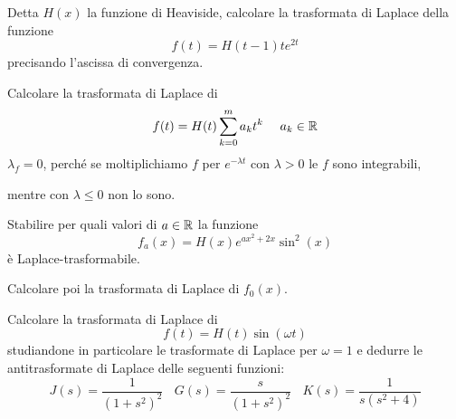 Detta $\displaystyle H( x)$ la funzione di Heaviside, calcolare la trasformata di Laplace della funzione
\begin{equation*}
f( t) =H( t-1) te^{2t}
\end{equation*}
precisando l'ascissa di convergenza.
\Esercizio{}

Calcolare la trasformata di Laplace di
\begin{equation*}
f( t) =H( t)\sum ^{m}_{k=0} a_{k} t^{k} \ \ \ \ a_{k} \in \RR 
\end{equation*}
$\displaystyle \lambda _{f} =0$, perché se moltiplichiamo $\displaystyle f$ per $\displaystyle e^{-\lambda t}$ con $\displaystyle \lambda  >0$ le $\displaystyle f$ sono integrabili, 

mentre con $\displaystyle \lambda \leqslant 0$ non lo sono.
\Esercizio{}

Stabilire per quali valori di $\displaystyle a\in \mathbb{R} $ la funzione
\begin{equation*}
f_{a}( x) =H( x) e^{ax^{2} +2x}\sin^{2}( x)
\end{equation*}
è Laplace-trasformabile.

Calcolare poi la trasformata di Laplace di $\displaystyle f_{0}( x)$.
\Esercizio{}

Calcolare la trasformata di Laplace di
\begin{equation*}
f( t) =H( t)\sin( \omega t)
\end{equation*}
studiandone in particolare le trasformate di Laplace per $\displaystyle \omega =1$ e dedurre le antitrasformate di Laplace delle seguenti funzioni:
\begin{equation*}
J( s) =\frac{1}{\left( 1+s^{2}\right)^{2}} \ \ \ \ G( s) =\frac{s}{\left( 1+s^{2}\right)^{2}} \ \ \ \ K( s) =\frac{1}{s\left( s^{2} +4\right)}
\end{equation*}
\ParteSoluzioni
\Soluzione

